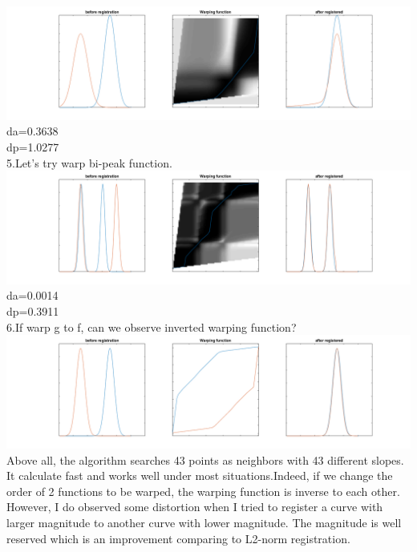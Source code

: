 \documentclass[11pt]{scrartcl}
\begin{document}
\includegraphics[scale=0.4]{hw54.png}\\
da=0.3638\\
dp=1.0277\\
5.Let's try warp bi-peak function.\\
\includegraphics[scale=0.4]{hw55.png}\\
da=0.0014\\
dp=0.3911\\
6.If warp g to f, can we observe inverted warping function?\\
\includegraphics[scale=0.4]{hw56.png}\\
Above all, the algorithm searches 43 points as neighbors with 43 different slopes. It calculate fast and works well under most situations.Indeed, if we change the order of 2 functions to be warped, the warping function is inverse to each other.\\
However, I do observed some distortion when I tried to register a curve with larger magnitude to another curve with lower magnitude. The magnitude is well reserved which is an improvement comparing to L2-norm registration.\\

\bigskip
\end{document}
